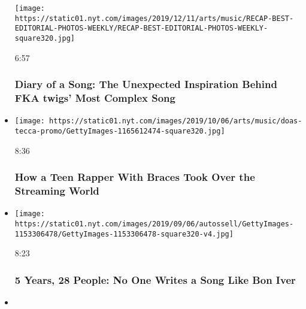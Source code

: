 \begin{itemize}
  \texttt{[image: https://static01.nyt.com/images/2019/12/11/arts/music/RECAP-BEST-EDITORIAL-PHOTOS-WEEKLY/RECAP-BEST-EDITORIAL-PHOTOS-WEEKLY-square320.jpg]}

  6:57

  \hypertarget{diary-of-a-song-the-unexpected-inspiration-behind-fka-twigs-most-complex-song}{%
  \subsubsection{Diary of a Song: The Unexpected Inspiration Behind FKA
  twigs' Most Complex
  Song}\label{diary-of-a-song-the-unexpected-inspiration-behind-fka-twigs-most-complex-song}}
\item
  \href{https://www.nytimes.com/video/arts/music/100000006686500/lil-tecca-ransom.html?action=click\&module=video-series-bar\&region=header\&pgtype=Article\&playlistId=video/diaryofasong}{}

  \texttt{[image: https://static01.nyt.com/images/2019/10/06/arts/music/doas-tecca-promo/GettyImages-1165612474-square320.jpg]}

  8:36

  \hypertarget{how-a-teen-rapper-with-braces-took-over-the-streaming-world}{%
  \subsubsection{How a Teen Rapper With Braces Took Over the Streaming
  World}\label{how-a-teen-rapper-with-braces-took-over-the-streaming-world}}
\item
  \href{https://www.nytimes.com/video/arts/music/100000006630077/bon-iver-imi.html?action=click\&module=video-series-bar\&region=header\&pgtype=Article\&playlistId=video/diaryofasong}{}

  \texttt{[image: https://static01.nyt.com/images/2019/09/06/autossell/GettyImages-1153306478/GettyImages-1153306478-square320-v4.jpg]}

  8:23

  \hypertarget{5-years-28-people-no-one-writes-a-song-like-bon-iver}{%
  \subsubsection{5 Years, 28 People: No One Writes a Song Like Bon
  Iver}\label{5-years-28-people-no-one-writes-a-song-like-bon-iver}}
\item
  \href{https://www.nytimes.com/video/arts/music/100000006486498/rosalia-j-balvin-con-altura.html?action=click\&module=video-series-bar\&region=header\&pgtype=Article\&playlistId=video/diaryofasong}{}


\end{itemize}
